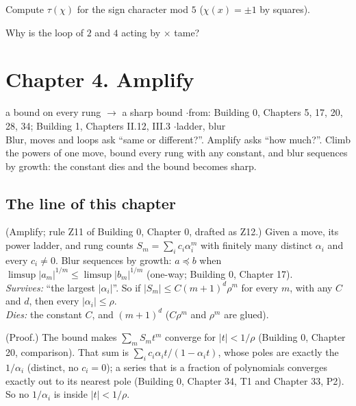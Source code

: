 \begin{lines}
\item[\lab{E1}] Compute $\tau(\chi)$ for the sign character mod $5$ ($\chi(x) = \pm 1$ by squares).
\item[\lab{E2}] Why is the loop of $2$ and $4$ acting by $\times$ tame?
\end{lines}

\newpage

\section*{Chapter 4. Amplify}
\begin{center}
{\normalsize a bound on every rung $\to$ a sharp bound \quad$\cdot$\quad from: Building 0, Chapters 5, 17, 20, 28, 34; Building 1, Chapters II.12, III.3 \quad$\cdot$\quad ladder, blur}\\[4pt]
{\small Blur, moves and loops ask ``same or different?''. Amplify asks ``how much?''. Climb the powers of one move, bound every rung with any constant, and blur sequences by growth: the constant dies and the bound becomes sharp.}
\end{center}

\subsection*{The line of this chapter}

\begin{lines}
\item[\lab{L}] (Amplify; rule Z11 of Building 0, Chapter 0, drafted as Z12.) Given a move, its power ladder, and rung counts $S_m = \sum_i c_i \alpha_i^m$ with finitely many distinct $\alpha_i$ and every $c_i \ne 0$. Blur sequences by growth: $a \preceq b$ when $\limsup |a_m|^{1/m} \le \limsup |b_m|^{1/m}$ (one-way; Building 0, Chapter 17). \\
\emph{Survives:} ``the largest $|\alpha_i|$''. So if $|S_m| \le C (m + 1)^d \rho^m$ for every $m$, with any $C$ and $d$, then every $|\alpha_i| \le \rho$. \\
\emph{Dies:} the constant $C$, and $(m + 1)^d$ ($C\rho^m$ and $\rho^m$ are glued).
\item[\lab{T1}] (Proof.) The bound makes $\sum_m S_m t^m$ converge for $|t| < 1/\rho$ (Building 0, Chapter 20, comparison). That sum is $\sum_i c_i \alpha_i t / (1 - \alpha_i t)$, whose poles are exactly the $1/\alpha_i$ (distinct, no $c_i = 0$); a series that is a fraction of polynomials converges exactly out to its nearest pole (Building 0, Chapter 34, T1 and Chapter 33, P2). So no $1/\alpha_i$ is inside $|t| < 1/\rho$.
\end{lines}

